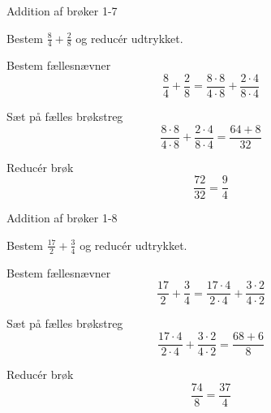 \documentclass{article}
\begin{document}
	\begin{exercise}{Addition af brøker 1-7}
		
		Bestem $\frac{8}{4}+\frac{2}{8}$ og reducér udtrykket.
		
		
		\hint
		
		Bestem fællesnævner
		\[
		\frac{8}{4}+\frac{2}{8}  = \frac{8 \cdot 8}{4 \cdot 8}+\frac{2 \cdot 4}{8\cdot 4} 
		\]
		
		\hint
		
		Sæt på fælles brøkstreg
		\[
		 \frac{8 \cdot 8}{4 \cdot 8}+\frac{2 \cdot 4}{8\cdot 4}  = \frac{64+8}{32} 
		\]
		
		\hint
		
		Reducér brøk
		\[
		\frac{72}{32} = \frac{9}{4}
		\]
		
	\end{exercise}
	
	\newpage
	
	\begin{exercise}{Addition af brøker 1-8}
		
		Bestem $\frac{17}{2}+\frac{3}{4}$ og reducér udtrykket.
		
		
		\hint
		
		Bestem fællesnævner
		\[
		\frac{17}{2}+\frac{3}{4}  = \frac{17 \cdot 4}{2 \cdot 4}+\frac{3 \cdot 2}{4\cdot 2} 
		\]
		
		\hint
		
		Sæt på fælles brøkstreg
		\[
		\frac{17 \cdot 4}{2 \cdot 4}+\frac{3 \cdot 2}{4\cdot 2}   = \frac{68+6}{8} 
		\]
		
		\hint
		
		Reducér brøk
		\[
		\frac{74}{8} = \frac{37}{4}
		\]
		
	\end{exercise}
	
	
\end{document}
